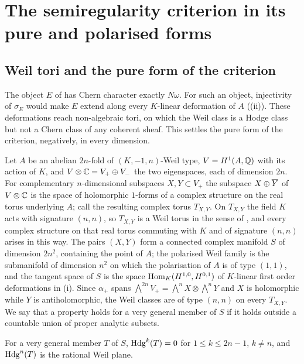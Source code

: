 \section{The semiregularity criterion in its pure and polarised forms}\label{sec:polarised}

\subsection{Weil tori and the pure form of the criterion}

The object $E$ of \cite[Section~16]{paperI} has Chern character exactly
$N\omega$. For such an object, injectivity of $\sigma_{E}$ would make $E$
extend along every $K$-linear deformation of $A$ ((ii)). These
deformations reach non-algebraic tori, on which the Weil class is a Hodge
class but not a Chern class of any coherent sheaf. This settles the pure form
of the criterion, negatively, in every dimension.

\begin{setupenv}\label{setup:weiltori}
Let $A$ be an abelian $2n$-fold of $(K,-1,n)$-Weil type, $V=H^{1}(A,\mathbb{Q})$ with
its action of $K$, and $V\otimes\mathbb{C}=V_{+}\oplus V_{-}$ the two eigenspaces,
each of dimension $2n$. For complementary $n$-dimensional subspaces
$X,Y\subset V_{+}$ the subspace $X\oplus\overline{Y}$ of $V\otimes\mathbb{C}$ is the
space of holomorphic $1$-forms of a complex structure on the real torus
underlying $A$; call the resulting complex torus $T_{X,Y}$. On $T_{X,Y}$ the
field $K$ acts with signature $(n,n)$, so $T_{X,Y}$ is a Weil torus in the
sense of \cite{Voi02b}, and every complex structure on that real torus
commuting with $K$ and of signature $(n,n)$ arises in this way. The pairs
$(X,Y)$ form a connected complex manifold $S$ of dimension $2n^{2}$,
containing the point of $A$; the polarised Weil family is the submanifold of
dimension $n^{2}$ on which the polarisation of $A$ is of type $(1,1)$, and the
tangent space of $S$ is the space $\operatorname{Hom}_{K}(H^{1,0},H^{0,1})$ of $K$-linear
first order deformations in (i). Since
$\alpha_{+}$ spans $\bigwedge^{2n}V_{+}=\bigwedge^{n}X\otimes\bigwedge^{n}Y$
and $X$ is holomorphic while $Y$ is antiholomorphic, the Weil classes are of
type $(n,n)$ on every $T_{X,Y}$. We say that a property holds for a very
general member of $S$ if it holds outside a countable union of proper
analytic subsets.
\end{setupenv}

\begin{lemma}
\label{lem:weiltorushodge}
For a very general member $T$ of $S$, $\mathrm{Hdg}^{k}(T)=0$ for
$1\le k\le2n-1$, $k\ne n$, and $\mathrm{Hdg}^{n}(T)$ is the rational Weil plane.
\end{lemma}

